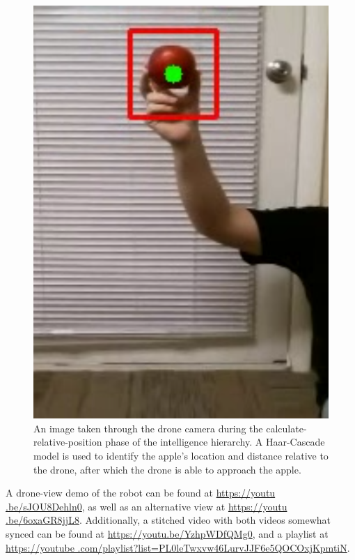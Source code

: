 \begin{figure}[htb]
    \centering
    \includegraphics[scale=0.4,keepaspectratio]
    {./figures/haar-cascade-detection}
    \caption{
        An image taken through the drone camera during the
        calculate-relative-position phase of the intelligence hierarchy.
        A Haar-Cascade model is used to identify the apple's location and distance
        relative to the drone, after which the drone is able to approach the apple.
    }
    \label{fig:drone-haar-cascade}
\end{figure}

A drone-view demo of the robot can be found at \mbox{\url{https://youtu
.be/sJOU8Dehln0}}, as well as an alternative view at \mbox{\url{https://youtu
.be/6oxaGR8jjL8}}.
Additionally, a stitched video with both videos somewhat synced can be found at
\mbox{\url{https://youtu.be/YzhpWDfQMg0}}, and a playlist at \url{https://youtube
.com/playlist?list=PL0leTwxvw46LurvJJF6e5QOCOxjKpmtiN}.
